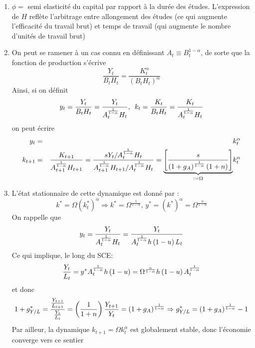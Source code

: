 \documentclass[a4paper,11pt]{article}
\begin{document}
\begin{enumerate}
\item $\phi =$ semi elasticit\'{e} du capital par rapport \`{a} la dur\'{e}e
des \'{e}tudes. L'expression de $H$ refl\`{e}te l'arbitrage entre
allongement des \'{e}tudes (ce qui augmente l'efficacit\'{e} du travail
brut) et temps de travail (qui augmente le nombre d'unit\'{e}s de travail
brut)

\item On peut se ramener \`{a} un cas connu en d\'{e}finissant $A_{t}\equiv
B_{t}^{1-\alpha }$, de sorte que la fonction de production s'\'{e}crive 
\begin{equation*}
\frac{Y_{t}}{B_{t}H_{t}}=\frac{K_{t}^{\alpha }}{\left( B_{t}H_{t}\right)
^{\alpha }}
\end{equation*}%
Ainsi, si on d\'{e}finit%
\begin{equation*}
y_{t}=\frac{Y_{t}}{B_{t}H_{t}}=\frac{Y_{t}}{A_{t}^{\frac{1}{1-\alpha }}H_{t}}%
\text{, \ }k_{t}=\frac{K_{t}}{B_{t}H_{t}}=\frac{K_{t}}{A_{t}^{\frac{1}{%
1-\alpha }}H_{t}}
\end{equation*}%
on peut \'{e}crire%
\begin{eqnarray*}
y_{t} &=&k_{t}^{\alpha } \\
k_{t+1} &=&\frac{K_{t+1}}{A_{t+1}^{\frac{1}{1-\alpha }}H_{t+1}}=\frac{%
sY_{t}/A_{t}^{\frac{1}{1-\alpha }}H_{t}}{A_{t+1}^{\frac{1}{1-\alpha }%
}H_{t+1}/A_{t}^{\frac{1}{1-\alpha }}H_{t}}=\underset{:=\Omega }{\underbrace{%
\left[ \frac{s}{\left( 1+g_{A}\right) ^{\frac{1}{1-\alpha }}\left(
1+n\right) }\right] }}k_{t}^{\alpha }
\end{eqnarray*}

\item L'\'{e}tat stationnaire de cette dynamique est donn\'{e} par :%
\begin{equation*}
k^{\ast }=\Omega \left( k_{t}^{\ast }\right) ^{\alpha }\Rightarrow k^{\ast
}=\Omega ^{\frac{1}{1-\alpha }}\text{, }y^{\ast }=\left( k^{\ast }\right)
^{\alpha }=\Omega ^{\frac{\alpha }{1-\alpha }}
\end{equation*}%
On rappelle que%
\begin{equation*}
y_{t}=\frac{Y_{t}}{A_{t}^{\frac{1}{1-\alpha }}H_{t}}=\frac{Y_{t}}{A_{t}^{%
\frac{1}{1-\alpha }}h\left( 1-u\right) L_{t}}
\end{equation*}%
Ce qui implique, le long du SCE:%
\begin{equation*}
\frac{Y_{t}}{L_{t}}=y^{\ast }A_{t}^{\frac{1}{1-\alpha }}h\left( 1-u\right)
=\Omega ^{\frac{\alpha }{1-\alpha }}h\left( 1-u\right) A_{t}^{\frac{1}{%
1-\alpha }}
\end{equation*}%
et donc%
\begin{equation*}
1+g_{Y/L}^{\ast }=\frac{\frac{Y_{t+1}}{L_{t+1}}}{\frac{Y_{t}}{L_{t}}}=\left( 
\frac{1}{1+n}\right) \frac{Y_{t+1}}{Y_{t}}=\left( 1+g_{A}\right) ^{\frac{1}{%
1-\alpha }}\Rightarrow g_{Y/L}^{\ast }=\left( 1+g_{A}\right) ^{\frac{1}{%
1-\alpha }}-1
\end{equation*}%
Par ailleur, la dynamique $k_{t+1}=\Omega k_{t}^{\alpha }$ est globalement
stable, donc l'\'{e}conomie converge vers ce sentier


\end{enumerate}
\end{document}
